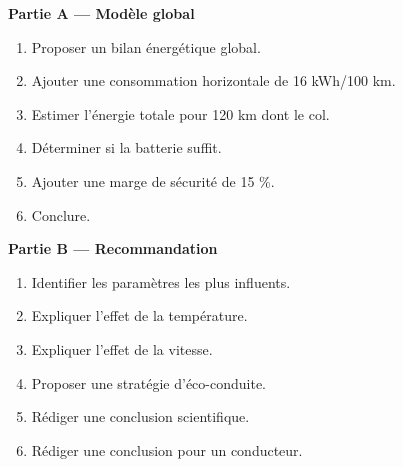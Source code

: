 \documentclass[11pt,a4paper]{article}
\begin{document}
\begin{difficile}
\textbf{Partie A — Modèle global}
\begin{enumerate}
  \item Proposer un bilan énergétique global.
  \item Ajouter une consommation horizontale de 16 kWh/100 km.
  \item Estimer l'énergie totale pour 120 km dont le col.
  \item Déterminer si la batterie suffit.
  \item Ajouter une marge de sécurité de 15 \%.
  \item Conclure.
\end{enumerate}

\textbf{Partie B — Recommandation}
\begin{enumerate}
  \item Identifier les paramètres les plus influents.
  \item Expliquer l'effet de la température.
  \item Expliquer l'effet de la vitesse.
  \item Proposer une stratégie d'éco-conduite.
  \item Rédiger une conclusion scientifique.
  \item Rédiger une conclusion pour un conducteur.
\end{enumerate}
\end{difficile}
\end{document}
